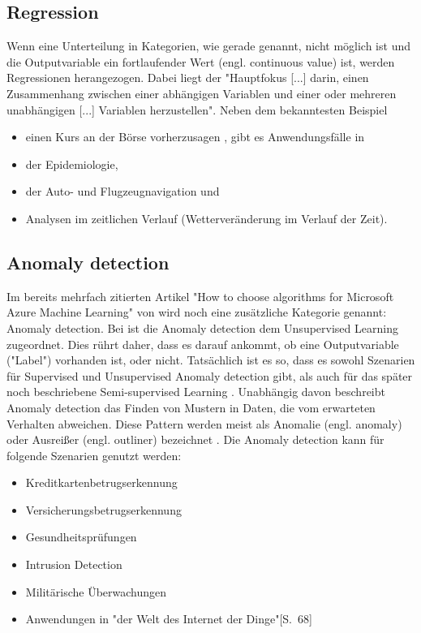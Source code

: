 \subsection{Regression}\label{subsubsec:regression}
Wenn eine Unterteilung in Kategorien, wie gerade genannt, nicht möglich ist und die Outputvariable ein fortlaufender Wert (engl. continuous value) ist, werden Regressionen herangezogen. Dabei liegt der "Hauptfokus [...] darin, einen Zusammenhang zwischen einer abhängigen Variablen und einer oder mehreren unabhängigen [...] Variablen herzustellen"\citep[S.~60; eigene Übersetzung]{swamynathan_mastering_2017}. Neben dem bekanntesten Beispiel
\begin{itemize}
\item einen Kurs an der Börse vorherzusagen , gibt es Anwendungsfälle in
\item der Epidemiologie,
\item der Auto- und Flugzeugnavigation und
\item Analysen im zeitlichen Verlauf (Wetterveränderung im Verlauf der Zeit)\citep[S.~5]{kauchak_neural_2016}.
\end{itemize}

\subsection{Anomaly detection}
Im bereits mehrfach zitierten Artikel "How to choose algorithms for Microsoft Azure Machine Learning" von \citep{ericson_how_2017} wird noch eine zusätzliche Kategorie genannt: Anomaly detection. Bei \citep[S.~68]{swamynathan_mastering_2017} ist die Anomaly detection dem Unsupervised Learning zugeordnet. Dies rührt daher, dass es darauf ankommt, ob eine Outputvariable ("Label") vorhanden ist, oder nicht. Tatsächlich ist es so, dass es sowohl Szenarien für Supervised und Unsupervised Anomaly detection gibt, als auch für das später noch beschriebene Semi-supervised Learning \citep[S.~15:10]{chandola_anomaly_2009}.
Unabhängig davon beschreibt Anomaly detection das Finden von Mustern in Daten, die vom erwarteten Verhalten abweichen. Diese Pattern werden meist als Anomalie (engl. anomaly) oder Ausreißer (engl. outliner) bezeichnet \citep[S.~15:1]{chandola_anomaly_2009}.
Die Anomaly detection kann für folgende Szenarien genutzt werden\citep[S.~15:2]{chandola_anomaly_2009}:
\begin{itemize}
\item Kreditkartenbetrugserkennung
\item Versicherungsbetrugserkennung
\item Gesundheitsprüfungen
\item Intrusion Detection
\item Militärische Überwachungen
\item Anwendungen in "der Welt des Internet der Dinge"[S.~68]\citep{swamynathan_mastering_2017}
\end{itemize}

